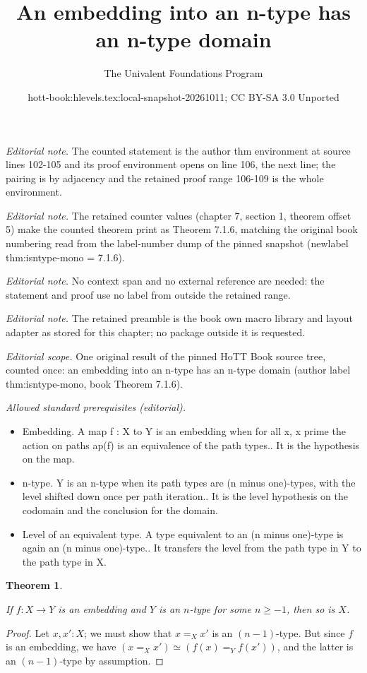 \documentclass[10pt,a4paper]{article}
\title{An embedding into an n-type has an n-type domain}
\author{The Univalent Foundations Program}
\date{hott-book:hlevels.tex:local-snapshot-20261011; CC BY-SA 3.0 Unported}
\newcounter{chapter}
\providecommand{\index}[1]{}
\newcommand{\id}[3][]{\ensuremath{#2 =_{#1} #3}\xspace}
\newcommand{\eqvsym}{\simeq}    %
\newcommand{\nminusone}{\ensuremath{(n-1)}}
\newtheorem{thm}{Theorem}[section]
\theoremstyle{definition}
\theoremstyle{remark}
\numberwithin{equation}{section}
\begin{document}
\maketitle
\setcounter{chapter}{7}
\setcounter{section}{1}
\setcounter{thm}{5}
\noindent\textit{Editorial note.} The counted statement is the author thm environment at source lines 102-105 and its proof environment opens on line 106, the next line; the pairing is by adjacency and the retained proof range 106-109 is the whole environment.\par\medskip
\noindent\textit{Editorial note.} The retained counter values (chapter 7, section 1, theorem offset 5) make the counted theorem print as Theorem 7.1.6, matching the original book numbering read from the label-number dump of the pinned snapshot (newlabel thm:isntype-mono = 7.1.6).\par\medskip
\noindent\textit{Editorial note.} No context span and no external reference are needed: the statement and proof use no label from outside the retained range.\par\medskip
\noindent\textit{Editorial note.} The retained preamble is the book own macro library and layout adapter as stored for this chapter; no package outside it is requested.\par\medskip
\noindent\textit{Editorial scope.} One original result of the pinned HoTT Book source tree, counted once: an embedding into an n-type has an n-type domain (author label thm:isntype-mono, book Theorem 7.1.6).\par\medskip
\noindent\textit{Allowed standard prerequisites (editorial).}\begin{itemize}
\item Embedding. A map f : X to Y is an embedding when for all x, x prime the action on paths ap(f) is an equivalence of the path types.. It is the hypothesis on the map.
\item n-type. Y is an n-type when its path types are (n minus one)-types, with the level shifted down once per path iteration.. It is the level hypothesis on the codomain and the conclusion for the domain.
\item Level of an equivalent type. A type equivalent to an (n minus one)-type is again an (n minus one)-type.. It transfers the level from the path type in Y to the path type in X.
\end{itemize}\medskip
\begin{thm}\label{thm:isntype-mono}
  \index{function!embedding}
  If $f:X\to Y$ is an embedding and $Y$ is an $n$-type for some $n\ge -1$, then so is $X$.
\end{thm}

\begin{proof}
  Let $x,x':X$; we must show that $\id[X]{x}{x'}$ is an $\nminusone$-type.
  But since $f$ is an embedding, we have $(\id[X]{x}{x'}) \eqvsym (\id[Y]{f(x)}{f(x')})$, and the latter is an $\nminusone$-type by assumption.
\end{proof}
\end{document}
